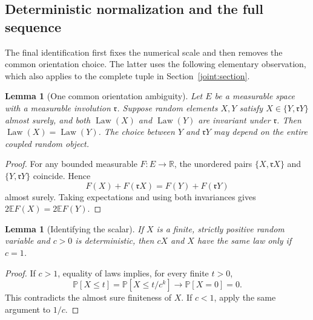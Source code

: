 \documentclass[11pt]{article}
\numberwithin{equation}{section}
\newtheorem{lemma}[theorem]{Lemma}
\theoremstyle{definition}
\theoremstyle{remark}
\newcommand{\R}{\mathbb R}
\newcommand{\PP}{\mathbb P}
\newcommand{\EE}{\mathbb E}
\newcommand{\1}{\mathbf 1}
\DeclareMathOperator{\Law}{Law}
\begin{document}
\subsection{Deterministic normalization and the full sequence}

The final identification first fixes the numerical scale and then
removes the common orientation choice.  The latter uses the following
elementary observation, which also applies to the complete tuple in
Section~\ref{joint:section}.

\begin{lemma}[One common orientation ambiguity]\label{joint:reflection}
Let $E$ be a measurable space with a measurable involution
$\mathfrak r$.  Suppose random elements $X,Y$ satisfy
$X\in\{Y,\mathfrak rY\}$ almost surely, and both $\Law(X)$ and
$\Law(Y)$ are invariant under $\mathfrak r$.  Then
$\Law(X)=\Law(Y)$.  The choice between $Y$ and $\mathfrak rY$ may
depend on the entire coupled random object.
\end{lemma}

\begin{proof}
For any bounded measurable $F:E\to\R$, the unordered pairs
$\{X,\mathfrak rX\}$ and $\{Y,\mathfrak rY\}$ coincide.  Hence
\[
 F(X)+F(\mathfrak rX)=F(Y)+F(\mathfrak rY)
\]
almost surely.  Taking expectations and using both invariances gives
$2\EE F(X)=2\EE F(Y)$.
\end{proof}

\begin{lemma}[Identifying the scalar]
\label{comp:scalar}
If $X$ is a finite, strictly positive random variable and $c>0$
is deterministic, then $cX$ and $X$ have the same law only if
$c=1$.
\end{lemma}

\begin{proof}
If $c>1$, equality of laws implies, for every finite $t>0$,
\[
 \PP[X\le t]=\PP[X\le t/c^k]\longrightarrow\PP[X=0]=0.
\]
This contradicts the almost sure finiteness of $X$.  If $c<1$,
apply the same argument to $1/c$.
\end{proof}
\end{document}
